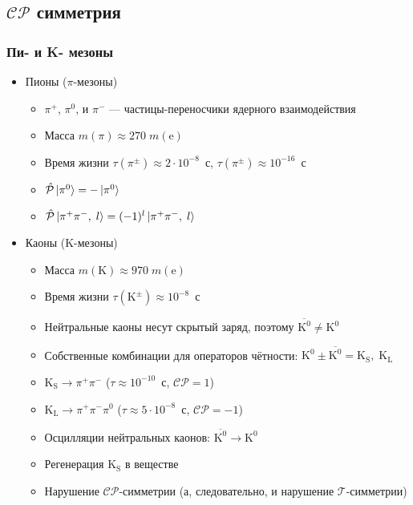 \subsection{$\mathcal{CP}$ симметрия}
\begin{frame}
    \frametitle{Пи- и K- мезоны}
    \begin{itemize}[<+->]
    \item Пионы ($\pi$-мезоны)
        \begin{itemize}[<+->]
        \item $\pi^+$, $\pi^0$, и $\pi^-$ --- частицы-переносчики ядерного
        взаимодействия
        \item Масса $m (\pi) \approx 270\; m (\text{e})$
        \item Время жизни $\tau (\pi^\pm) \approx 2 \cdot 10^{-8}$~с,
            $\tau (\pi^\pm) \approx 10^{-16}$~с
        \item $\hat{\mathcal{P}} \ket{\pi^0} = - \ket{\pi^0}$
        \item $\hat{\mathcal{P}} \ket{\pi^+\pi^-,\;l} = (-1)^l
            \ket{\pi^+ \pi^-,\;l}$
        \end{itemize}
    \item Каоны (K-мезоны)
        \begin{itemize}[<+->]
        \item Масса $m (\text{K}) \approx 970\; m (\text{e})$
        \item Время жизни $\tau (\text{K}^\pm) \approx 10^{-8}$~с
        \item Нейтральные каоны несут скрытый заряд, поэтому
            $\overline{\text{K}^0} \ne \text {K}^0$
        \item Собственные комбинации для операторов чётности:
            $\text{K}^0 \pm \overline{\text{K}^0} =
            \text{K}_\text{S},\;\text{K}_\text{L}$
        \item
            $\text{K}_\text{S}\to\pi^+\pi^-$ ($\tau \approx 10^{-10}$~с,
            $\mathcal{CP} = 1$)
        \item
            $\text{K}_\text{L}\to\pi^+\pi^-\pi^0$ ($\tau \approx 5\cdot10^{-8}$~с,
            $\mathcal{CP} = -1$)
        \item
            Осцилляции нейтральных каонов: $\overline{\text{K}^0} \to \text{K}^0$
        \item
            Регенерация $\text{K}_\text{S}$ в веществе
        \item
            Нарушение $\mathcal{CP}$-симметрии (а, следовательно, и нарушение
            $\mathcal{T}$-симметрии)
        \end{itemize}
    \end{itemize}
\end{frame}
